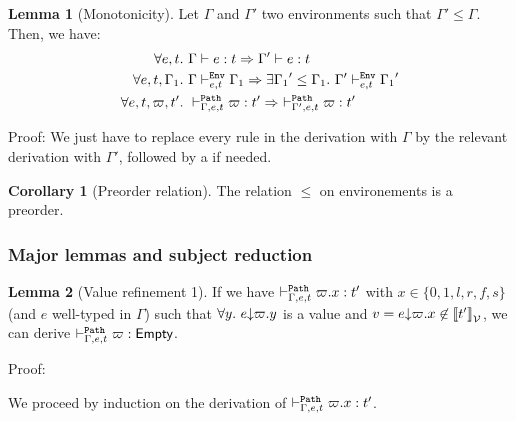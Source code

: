 \documentclass[a4paper]{article}
\theoremstyle{definition}
\newtheorem{lemma}{Lemma}
\newtheorem{corollary}{Corollary}
\begin{document}
        \begin{lemma}[Monotonicity]
          Let $\Gamma$ and $\Gamma'$ two environments such that $\Gamma' \leq \Gamma$.
          Then, we have:
          \begin{align*}
            \forall e,t.\ &\Gamma \vdash e:t \Rightarrow \Gamma' \vdash e:t\\
            \forall e,t,\Gamma_1.\ &\Gamma \vdash^{\texttt{Env}}_{e,t} \Gamma_1 \Rightarrow \exists {\Gamma_1}'\leq \Gamma_1.\ \Gamma' \vdash^{\texttt{Env}}_{e,t} {\Gamma_1}'\\
            \forall e,t,\varpi,t'.\ &\vdash^{\texttt{Path}}_{\Gamma,e,t} \varpi:t' \Rightarrow\ \vdash^{\texttt{Path}}_{\Gamma',e,t} \varpi:t'
          \end{align*}
        \end{lemma}
        Proof: We just have to replace every  rule in the derivation with $\Gamma$
        by the relevant derivation with $\Gamma'$, followed by a  if needed.

        \begin{corollary}[Preorder relation]
          The relation $\leq$ on environements is a preorder.
        \end{corollary}

        \subsubsection{Major lemmas and subject reduction}

        \begin{lemma}[Value refinement 1]
          If we have $\vdash^{\texttt{Path}}_{\Gamma,e,t} \varpi.x:t'$ with $x\in\{0,1,l,r,f,s\}$ (and $e$ well-typed in $\Gamma$) such that $\forall y.\ e{\downarrow}\varpi.y$ is a value
          and $v = e{\downarrow}\varpi.x \not\in {\llbracket t' \rrbracket}_{\mathcal{V}}$, we can derive $\vdash^{\texttt{Path}}_{\Gamma,e,t} \varpi:\textsf{Empty}$.
        \end{lemma}

        Proof:

        We proceed by induction on the derivation of $\vdash^{\texttt{Path}}_{\Gamma,e,t} \varpi.x:t'$.
\end{document}
